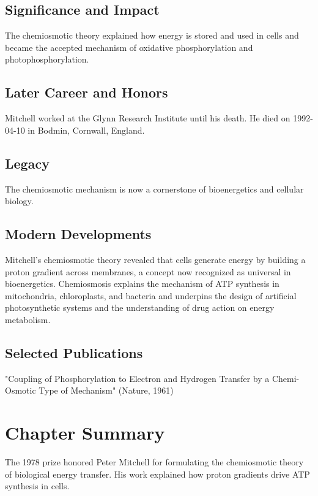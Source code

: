 \subsection*{Significance and Impact}

The chemiosmotic theory explained how energy is stored and used in cells and became the accepted mechanism of oxidative phosphorylation and photophosphorylation.

\subsection*{Later Career and Honors}

Mitchell worked at the Glynn Research Institute until his death. He died on 1992-04-10 in Bodmin, Cornwall, England.

\subsection*{Legacy}

The chemiosmotic mechanism is now a cornerstone of bioenergetics and cellular biology.

\subsection*{Modern Developments}

Mitchell's chemiosmotic theory revealed that cells generate energy by building a proton gradient across membranes, a concept now recognized as universal in bioenergetics. Chemiosmosis explains the mechanism of ATP synthesis in mitochondria, chloroplasts, and bacteria and underpins the design of artificial photosynthetic systems and the understanding of drug action on energy metabolism.

\subsection*{Selected Publications}

"Coupling of Phosphorylation to Electron and Hydrogen Transfer by a Chemi-Osmotic Type of Mechanism" (Nature, 1961)

\clearpage

\section*{Chapter Summary}

The 1978 prize honored Peter Mitchell for formulating the chemiosmotic theory of biological energy transfer. His work explained how proton gradients drive ATP synthesis in cells.

